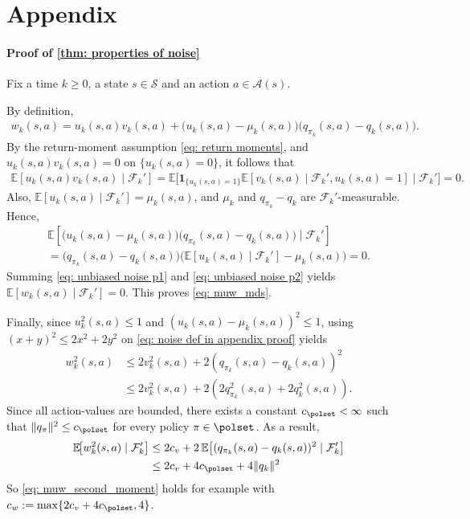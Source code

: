 \section*{Appendix}
\label{sec: Appendix}

\paragraph{Proof of \autoref{thm: properties of noise}}


Fix a time $k\ge 0$, a state $s \in \mathcal S$ and an action $a \in \mathcal A(s)$.

By definition,
\begin{align}
\label{eq: noise def in appendix proof}
w_k(s,a) = u_k(s,a) v_k(s,a) + \big( u_k(s,a)-\mu_k(s,a) \big) \big( q_{\pi_k}(s,a) - q_k(s,a) \big).
\end{align}
By the return-moment assumption \eqref{eq: return moments}, 
and $u_k(s,a) v_k(s,a) = 0$ on $\{u_k(s,a)=0\}$,
it follows that
\begin{align}
\label{eq: unbiased noise p1}
\mathbb E[ u_k(s,a) v_k(s,a) \mid \mathcal F_k']
=
\mathbb E \big[ 
    \mathbf 1_{\{u_k(s,a)=1\}} \mathbb E[ v_{k}(s,a) \mid \mathcal F_k', u_k(s,a)=1] 


    \mid \mathcal F_k' \big]
= 0 .
\end{align}
Also, $\mathbb E[u_k(s,a) \mid \mathcal F_k'] = \mu_k(s,a)$, and $\mu_k$ and $q_{\pi_k}-q_k$ are $\mathcal F_k'$-measurable. Hence,
\begin{multline}
\label{eq: unbiased noise p2}
\mathbb E \!\left[
\bigl( u_k(s,a)-\mu_k(s,a) \bigr) \bigl( q_{\pi_k}(s,a)-q_k(s,a) \bigr)
\mid \mathcal F_k'
\right]
\\
=
\big( q_{\pi_k}(s,a)-q_k(s,a) \big) 
\big( \mathbb E\!\left[ u_k(s,a) \mid \mathcal F_k'
\right]
-\mu_k(s,a) \big)
=
0 .
\end{multline}
Summing \eqref{eq: unbiased noise p1} and \eqref{eq: unbiased noise p2} yields $\mathbb E[w_k(s,a) \mid \mathcal F_k'] = 0$.
This proves \eqref{eq: muw_mds}.

Finally, since $u_k^2(s,a) \le 1$ and $(u_k(s,a) - \mu_k(s,a))^2 \le 1$,
using $(x+y)^2 \le 2 x^2 + 2 y^2$ on \eqref{eq: noise def in appendix proof} yields
\begin{align*}
w_k^2(s,a) 
&\le 2 v_k^2(s,a) + 2 (q_{\pi_k}(s,a)-q_k(s,a) )^2 
\\
&\le 2 v_k^2(s,a) + 2 ( 2 q_{\pi_k}^2(s,a) + 2 q_k^2(s,a) ) .
\end{align*}
Since all action-values are bounded,
there exists a constant $c_\polset < \infty$ such that $\|q_\pi\|^2 \leq c_\polset$ for every policy $\pi \in \polset$. As a result,
\begin{align*}
\mathbb E \!\big[ w_{k}^2(s,a) \mid \mathcal F'_k \big]
&\le
2 c_v + 2 \, \mathbb E \!\left[ ( q_{\pi_k}(s,a)-q_k(s,a) )^2 \mid \mathcal F'_k \right]
\\
&\le
2 c_v + 4 c_\polset + 4 \|q_k\|^2
\end{align*}
So \eqref{eq: muw_second_moment} holds for example with $c_w := \max \{ 2 c_v + 4 c_\polset, 4\}$.

